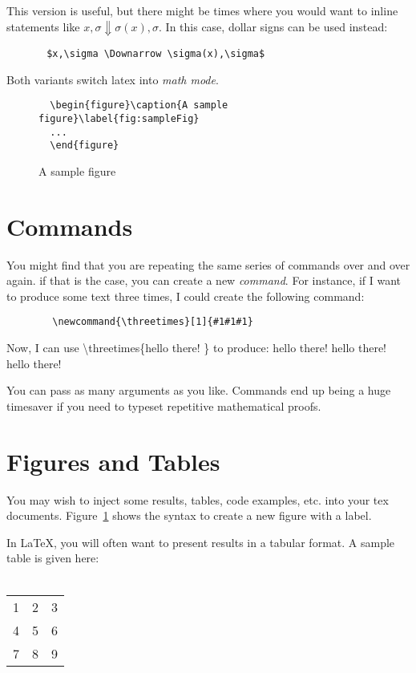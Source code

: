 \documentclass{article}
\begin{document}
This version is useful, but there might be times
where you would want to inline statements like $x,\sigma \Downarrow \sigma(x),\sigma$.
In this case, dollar signs can be used instead:
\begin{verbatim}
       $x,\sigma \Downarrow \sigma(x),\sigma$
\end{verbatim}

Both variants switch latex into {\em math mode}.

\begin{figure}\caption{A sample figure}\label{fig:sampleFig}
\begin{verbatim}
  \begin{figure}\caption{A sample figure}\label{fig:sampleFig}
  ...
  \end{figure}
\end{verbatim}
\end{figure}

\section{Commands}
You might find that you are repeating the same series of commands over and over again.
if that is the case, you can create a new {\em command}.
For instance, if I want to produce some text three times,
I could create the following command:
\newcommand{\threetimes}[1]{#1#1#1}
\begin{verbatim}
        \newcommand{\threetimes}[1]{#1#1#1}
\end{verbatim}

Now, I can use {\textbackslash}threetimes\{hello there! \} to produce:
\threetimes{hello there! }

You can pass as many arguments as you like.
Commands end up being a huge timesaver if you need to typeset
repetitive mathematical proofs.

\section{Figures and Tables}
You may wish to inject some results, tables, code examples, etc.
into your tex documents.
Figure~\ref{fig:sampleFig} shows the syntax to create a new figure
with a label.

In LaTeX, you will often want to present results in a tabular format.
A sample table is given here:~\\~\\

    \begin{tabular}{| l c r |}
    \hline
    1 & 2 & 3 \\
    4 & 5 & 6 \\
    7 & 8 & 9 \\
    \hline
    \end{tabular}
\end{document}
